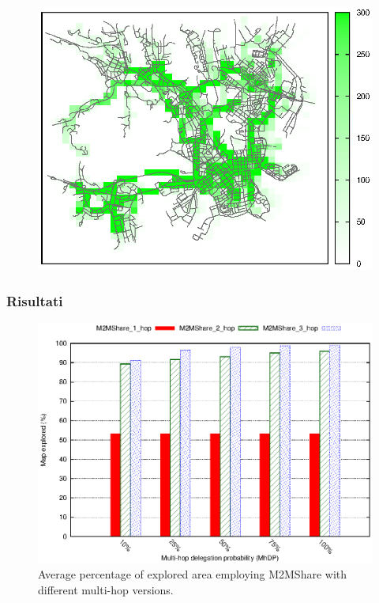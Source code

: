 \documentclass{beamer}
\begin{document}
\begin{frame}
\begin{figure}[htbp]
{\includegraphics[scale=0.38]{../grafici/mappe/M2MShare_3_hop_50perc.eps}}
\end{figure}
\end{frame}


\begin{frame}
\frametitle{Risultati}
\begin{center}
\begin{figure}[ht]
\includegraphics[scale=0.7]{../grafici/mapCovered_MultiHop.eps}
\caption{Average percentage of explored area employing M2MShare with different multi-hop versions.}
\end{figure}
\end{center}
\end{frame}
\end{document}
